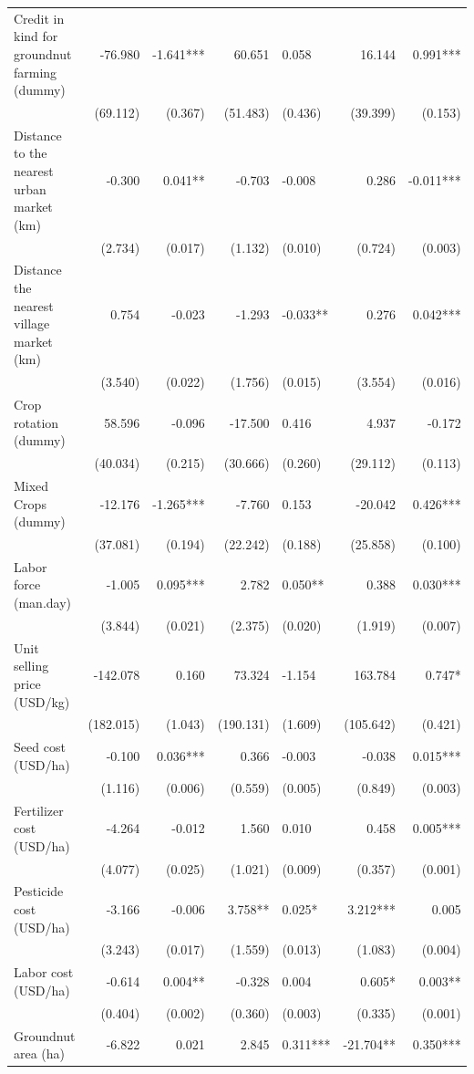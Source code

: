 \documentclass[
]{article}
\begin{document}
\begin{landscape}
\begin{longtable}[t]{lrrrlrr}
Credit in kind for groundnut farming (dummy) & -76.980 & -1.641*** & 60.651 & 0.058 & 16.144 & 0.991***\\
 & (69.112) & (0.367) & (51.483) & (0.436) & (39.399) & (0.153)\\
Distance to the nearest urban market (km) & -0.300 & 0.041** & -0.703 & -0.008 & 0.286 & -0.011***\\
 & (2.734) & (0.017) & (1.132) & (0.010) & (0.724) & (0.003)\\
Distance the nearest village market (km) & 0.754 & -0.023 & -1.293 & -0.033** & 0.276 & 0.042***\\
 & (3.540) & (0.022) & (1.756) & (0.015) & (3.554) & (0.016)\\
Crop rotation (dummy) & 58.596 & -0.096 & -17.500 & 0.416 & 4.937 & -0.172\\
 & (40.034) & (0.215) & (30.666) & (0.260) & (29.112) & (0.113)\\
Mixed Crops (dummy) & -12.176 & -1.265*** & -7.760 & 0.153 & -20.042 & 0.426***\\
 & (37.081) & (0.194) & (22.242) & (0.188) & (25.858) & (0.100)\\
Labor force (man.day) & -1.005 & 0.095*** & 2.782 & 0.050** & 0.388 & 0.030***\\
 & (3.844) & (0.021) & (2.375) & (0.020) & (1.919) & (0.007)\\
Unit selling price (USD/kg) & -142.078 & 0.160 & 73.324 & -1.154 & 163.784 & 0.747*\\
 & (182.015) & (1.043) & (190.131) & (1.609) & (105.642) & (0.421)\\
Seed cost (USD/ha) & -0.100 & 0.036*** & 0.366 & -0.003 & -0.038 & 0.015***\\
 & (1.116) & (0.006) & (0.559) & (0.005) & (0.849) & (0.003)\\
Fertilizer cost (USD/ha) & -4.264 & -0.012 & 1.560 & 0.010 & 0.458 & 0.005***\\
 & (4.077) & (0.025) & (1.021) & (0.009) & (0.357) & (0.001)\\
Pesticide cost (USD/ha) & -3.166 & -0.006 & 3.758** & 0.025* & 3.212*** & 0.005\\
 & (3.243) & (0.017) & (1.559) & (0.013) & (1.083) & (0.004)\\
Labor cost (USD/ha) & -0.614 & 0.004** & -0.328 & 0.004 & 0.605* & 0.003**\\
 & (0.404) & (0.002) & (0.360) & (0.003) & (0.335) & (0.001)\\
Groundnut area (ha) & -6.822 & 0.021 & 2.845 & 0.311*** & -21.704** & 0.350***\\

\end{longtable}
\end{landscape}
\end{document}
